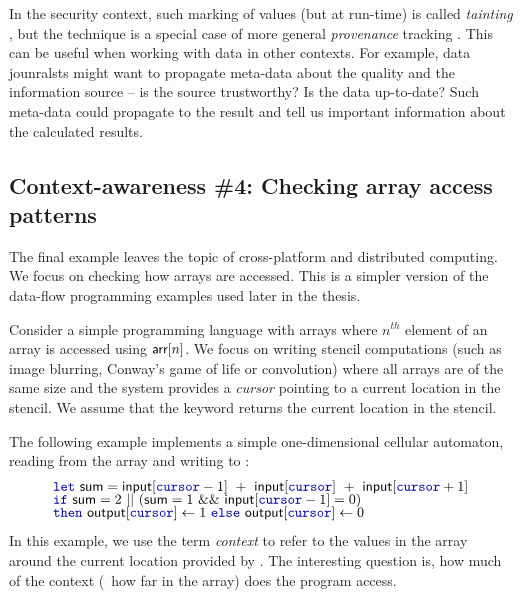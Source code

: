 In the security context, such marking of values (but at run-time) is called \emph{tainting} 
\cite{app-tainting-sql}, but the technique is a special case of more general \emph{provenance}
tracking \cite{app-provenance-future}. This can be useful when working with data in other contexts. 
For example, data jounralsts might want to propagate meta-data about the quality and the 
information source -- is the source trustworthy? Is the data up-to-date? Such meta-data could 
propagate to the result and tell us important information about the calculated results.


\subsection{Context-awareness \#4: Checking array access patterns}
\label{sec:intro-why-array}

The final example leaves the topic of cross-platform and distributed computing. We focus on
checking how arrays are accessed. This is a simpler version of the data-flow programming
examples used later in the thesis.

Consider a simple programming language with arrays where $n^{\mathit{th}}$ element of an
array  is accessed using $\textnormal{\sffamily arr}[n]$. We focus on writing stencil computations
(such as image blurring, Conway's game of life or convolution) where all arrays are of
the same size and the system provides a \emph{cursor} pointing to a current location in the 
stencil. We assume that the keyword  returns the current location in the stencil.

The following example implements a simple one-dimensional cellular automaton, reading from the
 array and writing to :
%
\begin{equation*}
\begin{array}{l}
\kvd{let}~\ident{sum}=\ident{input}[\kvd{cursor} - 1] ~+~ \ident{input}[\kvd{cursor}] ~+~ \ident{input}[\kvd{cursor} + 1]\\[-0.25em]
\kvd{if}~\ident{sum}=2 ~||~ (\ident{sum}=1 ~\&\&~ \ident{input}[\kvd{cursor} - 1] = 0)\\[-0.25em]
\kvd{then}~\ident{output}[\kvd{cursor}] \leftarrow 1 ~\kvd{else}~\ident{output}[\kvd{cursor}] \leftarrow 0
\end{array}
\end{equation*}
%
In this example, we use the term \emph{context} to refer to the values in the array around the
current location provided by . The interesting question is, how much of the context
(\ie~how far in the array) does the program access.

